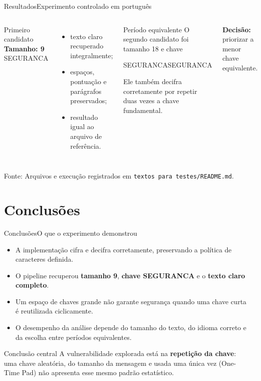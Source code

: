 \documentclass[10pt,aspectratio=169]{beamer}
\newcommand{\source}[1]{\vfill{\tiny\color{gray}Fonte: #1}}
\begin{document}
\begin{frame}{Resultados}{Experimento controlado em português}
  \begin{columns}[T,onlytextwidth]
      \begin{block}{Primeiro candidato}
        \centering
        \textbf{Tamanho: 9}\\[5pt]
        {\Large\ttfamily\color{unbgreen}SEGURANCA}
      \end{block}
      \begin{itemize}
        \item texto claro recuperado integralmente;
        \item espaços, pontuação e parágrafos preservados;
        \item resultado igual ao arquivo de referência.
      \end{itemize}
      \begin{alertblock}{Período equivalente}
        O segundo candidato foi tamanho 18 e chave
        \begin{center}
          \ttfamily SEGURANCASEGURANCA
        \end{center}
        Ele também decifra corretamente por repetir duas vezes a chave fundamental.
      \end{alertblock}
      \textbf{Decisão:} priorizar a menor chave equivalente.
  \end{columns}
  \source{Arquivos e execução registrados em \texttt{textos para testes/README.md}.}
\end{frame}

\section{Conclusões}
\begin{frame}{Conclusões}{O que o experimento demonstrou}
  \begin{itemize}
    \item A implementação cifra e decifra corretamente, preservando a política de caracteres definida.
    \item O pipeline recuperou \textbf{tamanho 9}, \textbf{chave SEGURANCA} e o \textbf{texto claro completo}.
    \item Um espaço de chaves grande não garante segurança quando uma chave curta é reutilizada ciclicamente.
    \item O desempenho da análise depende do tamanho do texto, do idioma correto e da escolha entre períodos equivalentes.
  \end{itemize}

  \vspace{6pt}
  \begin{block}{Conclusão central}
    A vulnerabilidade explorada está na \textbf{repetição da chave}: uma chave aleatória, do tamanho da mensagem e usada uma única vez (One-Time Pad) não apresenta esse mesmo padrão estatístico.
  \end{block}
\end{frame}
\end{document}

